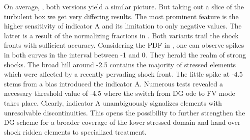 On average, , both versions yield a similar picture.
But taking out a slice of the turbulent box we get very differing results.  The
most prominent feature is the higher sensitivity of indicator A and its
limitation to only negative values. The latter is a result of the normalizing
fractions in . Both variants trail the shock fronts with
sufficient accuracy. Considering the PDF in , one can
observe spikes in both curves in the interval between -1 and 0. They herald the
realm of strong shocks. The broad hill around -2.5 contains the majority of
stressed elements which were affected by a recently pervading shock front.  The
little spike at -4.5 stems from a bias introduced the indicator A. Numerous
tests revealed a necessary threshold value of -4.5 where the switch from DG
ode to FV mode takes place. Clearly, indicator A unambiguously signalizes
elements with unresolvable discontinuities. This opens the possibility to
further strengthen the DG scheme for a broader coverage of the lower stressed
domain and hand over shock ridden elements to specialized treatment.
